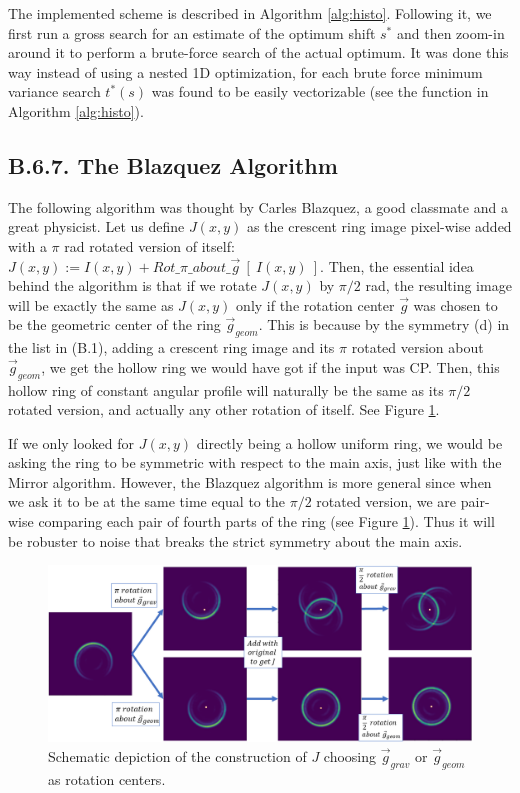 \documentclass[11pt, a4paper, twoside]{article} %
\begin{document}
The implemented scheme is described in Algorithm \ref{alg:histo}. Following it, we first run a gross search for an estimate of the optimum shift $s^*$ and then zoom-in around it to perform a brute-force search of the actual optimum. It was done this way instead of using a nested 1D optimization, for each brute force minimum variance search $t^*(s)$ was found to be easily vectorizable (see the function in Algorithm \ref{alg:histo}).\vspace{-0.2cm}

\subsection*{B.6.7. The Blazquez Algorithm}\vspace{-0.1cm}
The following algorithm was thought by Carles Blazquez, a good classmate and a great physicist. Let us define $J(x,y)$ as the crescent ring image pixel-wise added with a $\pi$ rad rotated version of itself: $J(x,y):=I(x,y)+Rot\_\pi\_about\_\vec{g}\ [\ I(x,y)\ ]$. Then, the essential idea behind the algorithm is that if we rotate $J(x,y)$ by $\pi/2$ rad, the resulting image will be exactly the same as $J(x,y)$ only if the rotation center $\vec{g}$ was chosen to be the geometric center of the ring $\vec{g}_{geom}$. This is because by the symmetry (d) in the list in (B.1), adding a crescent ring image and its $\pi$ rotated version about $\vec{g}_{geom}$, we get the hollow ring we would have got if the input was CP. Then, this hollow ring of constant angular profile will naturally be the same as its $\pi/2$ rotated version, and actually any other rotation of itself. See Figure \ref{fig:blaz}.

If we only looked for $J(x,y)$ directly being a hollow uniform ring, we would be asking the ring to be symmetric with respect to the main axis, just like with the Mirror algorithm. However, the Blazquez algorithm is more general since when we ask it to be at the same time equal to the $\pi/2$ rotated version, we are pair-wise comparing each pair of fourth parts of the ring (see Figure \ref{fig:blaz}). Thus it will be robuster to noise that breaks the strict symmetry about the main axis.

\begin{figure}[h!] 
     \centering 
    \includegraphics[width=0.9\linewidth]{blaz.PNG}
    \caption{ Schematic depiction of the construction of $J$ choosing $\vec{g}_{grav}$ or $\vec{g}_{geom}$ as rotation centers. }
    \label{fig:blaz}
\end{figure}
\end{document}
